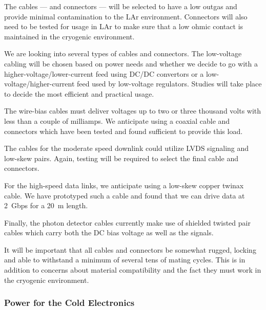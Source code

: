 The cables --- and connectors --- will be selected to have a low outgas and provide minimal contamination to the LAr environment.
Connectors will also need to be tested for usage in LAr to make sure that a low ohmic contact is maintained
in the cryogenic environment.

We are looking into several types of cables and connectors.
The low-voltage cabling will be %
chosen based on power needs and whether we decide to go with a higher-voltage/lower-current
feed using DC/DC convertors or a low-voltage/higher-current feed used by low-voltage regulators.
Studies will take place to decide the most efficient and practical usage.

The wire-bias cables must deliver voltages up to %
two or three thousand volts with less than a couple of milliamps.
We anticipate using a coaxial cable and connectors which have been tested and found sufficient to provide this load.

The cables for the moderate speed downlink could utilize LVDS signaling and low-skew pairs.
Again, testing will be required to %
select the final cable and connectors.

For the high-speed data links, we anticipate using a low-skew copper twinax cable.
We have prototyped such a cable and found that we can drive data at 2~Gbps for a 20~m length.

Finally, the photon detector cables currently make use of shielded twisted pair cables which carry both
the DC bias voltage as well as the signals.

It will be important that all cables and connectors be somewhat rugged,
locking and able to withstand a minimum of several tens of mating cycles.
This is in addition to concerns about material compatibility and the fact they must work in the cryogenic environment.

%
\subsubsection{Power for the Cold Electronics }
\label{subsubsec:ce_feedthrough_power}

